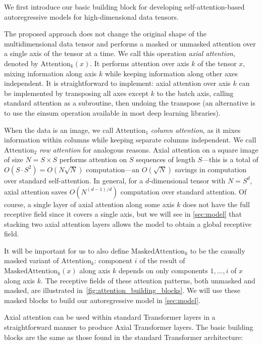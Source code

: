 \documentclass{article} \usepackage{iclr2020_conference,times}
\begin{document}
We first introduce our basic building block for developing self-attention-based autoregressive models for high-dimensional data tensors.

The proposed approach does not change the original shape of the multidimensional data tensor and performs a masked or unmasked attention over a single axis of the tensor at a time.
We call this operation \emph{axial attention}, denoted by $\text{Attention}_k(x)$. It performs attention over axis $k$ of the tensor $x$, mixing information along axis $k$ while keeping information along other axes independent. It is straightforward to implement: axial attention over axis $k$ can be implemented by transposing all axes except $k$ to the batch axis, calling standard attention as a subroutine, then undoing the transpose (an alternative is to use the $\text{einsum}$ operation available in most deep learning libraries).

When the data is an image, we call $\text{Attention}_1$ \emph{column attention}, as it mixes information within columns while keeping separate columns independent. We call $\text{Attention}_2$ \emph{row attention} for analogous reasons. Axial attention on a square image of size $N = S \times S$ performs attention on $S$ sequences of length $S$---this is a total of $O(S \cdot S^2) = O(N \sqrt{N})$ computation---an $O(\sqrt{N})$ savings in computation over standard self-attention. In general, for a $d$-dimensional tensor with $N = S^d$, axial attention saves $O(N^{(d-1)/d})$ computation over standard attention. Of course, a single layer of axial attention along some axis $k$ does not have the full receptive field since it covers a single axis, but we will see in \cref{sec:model} that stacking two axial attention layers allows the model to obtain a global receptive field.


It will be important for us to also define $\text{MaskedAttention}_k$ to be the causally masked variant of $\text{Attention}_k$: component $i$ of the result of $\text{MaskedAttention}_k(x)$ along axis $k$ depends on only components $1, \dotsc, i$ of $x$ along axis $k$. The receptive fields of these attention patterns, both unmasked and masked, are illustrated in~\cref{fig:attention_building_blocks}. We will use these masked blocks to build our autoregressive model in \cref{sec:model}.

Axial attention can be used within standard Transformer layers in a straightforward manner to produce Axial Transformer layers. The basic building blocks are the same as those found in the standard Transformer architecture:
\end{document}
